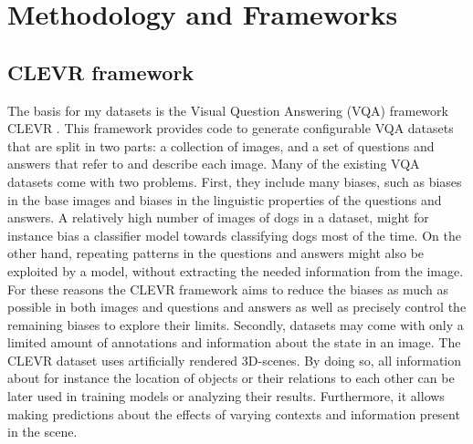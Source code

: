 \section{Methodology and Frameworks}
\label{sec:methodology}

\subsection{CLEVR framework}
The basis for my datasets is the Visual Question Answering (VQA) framework CLEVR \citep{Johnson2017a}.
This framework provides code to generate configurable VQA datasets that are split in two parts: a collection of images, and a set of questions and answers that refer to and describe each image.
Many of the existing VQA datasets come with two problems.
First, they include many biases, such as biases in the base images and biases in the linguistic properties of the questions and answers.
A relatively high number of images of dogs in a dataset, might for instance bias a classifier model towards classifying dogs most of the time.
On the other hand, repeating patterns in the questions and answers might also be exploited by a model, without extracting the needed information from the image.
For these reasons the CLEVR framework aims to reduce the biases as much as possible in both images and questions and answers as well as precisely control the remaining biases to explore their limits.
Secondly, datasets may come with only a limited amount of annotations and information about the state in an image.
The CLEVR dataset uses artificially rendered 3D-scenes.
By doing so, all information about for instance the location of objects or their relations to each other can be later used in training models or analyzing their results.
Furthermore, it allows making predictions about the effects of varying contexts and information present in the scene.

